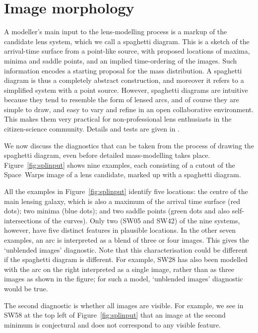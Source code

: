 \section{Image morphology}\label{sec:morph}

A modeller's main input to the lens-modelling process is a markup of
the candidate lens system, which we call a spaghetti diagram.
This is a sketch of the arrival-time surface from a point-like source,
with proposed locations of maxima, minima and saddle points, and an
implied time-ordering of the images.  Such information encodes a
starting proposal for the mass distribution.  A spaghetti diagram is
thus a completely abstract construction, and moreover it refers to a
simplified system with a point source.  However, spaghetti diagrams
are intuitive because they tend to resemble the form of lensed arcs,
and of course they are simple to draw, and easy to vary and refine in
an open collaborative environment.  This makes them very practical for
non-professional lens enthusiasts in the citizen-science community.
Details and tests are given in \cite{2015MNRAS.447.2170K}.

We now discuss the diagnostics that can be taken from the process of
drawing the spaghetti diagram, even before detailed mass-modelling
takes place.  Figure~\ref{fig:splinput} shows nine examples, each
consisting of a cutout of the Space~Warps image of a lens candidate,
marked up with a spaghetti diagram.

All the examples in Figure~\ref{fig:splinput} identify five locations:
the centre of the main lensing galaxy, which is also a maximum of the
arrival time surface (red dots); two minima (blue dots); and two
saddle points (green dots and also self-intersections of the curves).
Only two (SW05 and SW42) of the nine systems, however, have five
distinct features in plausible locations.  In the other seven
examples, an arc is interpreted as a blend of three or four images.
This gives the `unblended images' diagnostic.  Note that this
characterisation could be different if the spaghetti diagram is
different.  For example, SW28 has also been modelled with the arc on
the right interpreted as a single image, rather than as three images
as shown in the figure; for such a model, `unblended images'
diagnostic would be true.

The second diagnostic is whether all images are visible.  For example,
we see in SW58 at the top left of Figure~\ref{fig:splinput} that an
image at the second minimum is conjectural and does not correspond to
any visible feature.

